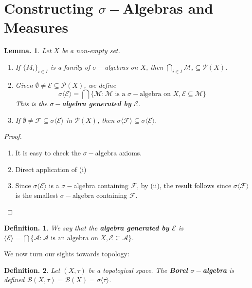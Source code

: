 \documentclass[11pt, a4paper]{memoir}
\newcommand{\mbf}[1]{{\boldmath\bfseries #1}}
\theoremstyle{change}
\newtheorem{lemma}[theorem]{Lemma.}
\theoremstyle{plain}
\theoremstyle{nonumberplain}
\newtheorem{definition}{Definition.}
\newtheorem{proof}{Proof}
\numberwithin{equation}{section}
\begin{document}
\section{Constructing \texorpdfstring{$\sigma-$}{s-}Algebras and Measures}
\begin{lemma}
    Let $X$ be a non-empty set.
    \begin{enumerate}[nl,r]
        \item If $\{M_i\}_{i\in I}$ is a family of $\sigma-$algebras on $X$, then $\bigcap_{i\in I}\mathcal{M}_i\subseteq\mathcal{P}(X)$.
        \item Given $\emptyset\neq\mathcal{E}\subseteq\mathcal{P}(X)$, we define
            \begin{equation*}
                \sigma\langle\mathcal{E}\rangle=\bigcap\bigl\{\mathcal{M}:\mathcal{M}\text{ is a $\sigma-$algebra on }X,\mathcal{E}\subseteq\mathcal{M}\bigr\}
            \end{equation*}
            This is the \mbf{$\sigma-$algebra generated by $\mathcal{E}$}.
        \item If $\emptyset\neq\mathcal{F}\subseteq\sigma\langle\mathcal{E}\rangle$ in $\mathcal{P}(X)$, then $\sigma\langle\mathcal{F}\rangle\subseteq\sigma\langle\mathcal{E}\rangle$.
    \end{enumerate}
\end{lemma}
\begin{proof}
    \begin{enumerate}[nl,r]
        \item It is easy to check the $\sigma-$algebra axioms.
        \item Direct application of (i)
        \item Since $\sigma\langle\mathcal{E}\rangle$ is a $\sigma-$algebra containing $\mathcal{F}$, by (ii), the result follows since $\sigma\langle\mathcal{F}\rangle$ is the smallest $\sigma-$algebra containing $\mathcal{F}$.
    \end{enumerate}
\end{proof}
\begin{definition}
    We say that the \mbf{algebra generated by $\mathcal{E}$} is $\langle\mathcal{E}\rangle=\bigcap\{\mathcal{A}:\mathcal{A}\text{ is an algebra on }X,\mathcal{E}\subseteq\mathcal{A}\}$.
\end{definition}
We now turn our sights towards topology:
\begin{definition}
    Let $(X,\tau)$ be a topological space.
    The \mbf{Borel $\sigma-$algebra} is defined $\mathcal{B}(X,\tau)=\mathcal{B}(X)=\sigma\langle\tau\rangle$.
\end{definition}
\end{document}
